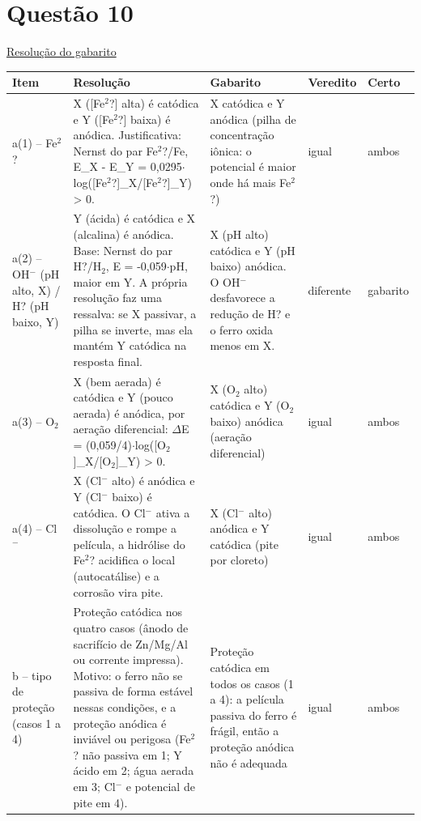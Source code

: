 \documentclass{article}%
\begin{document}
\section*{Questão 10}%
\href{https://poliedroresolve.sistemapoliedro.com.br/vestibulares/ita/2027/ita-2-fase-dia-2-21-10-2026-2-fase-dia-2/dissertativa-10-quimica-2-fase-dia-2-ita-2027}{Resolução do gabarito}\par\smallskip%
\begin{longtable}{@{}p{} p{} p{} p{} p{}@{}}\toprule Item & Resolução & Gabarito & Veredito & Certo \\ \midrule
a(1) -- Fe$^2$? & X ({[}Fe$^2$?{]} alta) é catódica e Y ({[}Fe$^2$?{]} baixa) é anódica. Justificativa: Nernst do par Fe$^2$?/Fe, E\_X - E\_Y = 0,0295$\cdot$log({[}Fe$^2$?{]}\_X/{[}Fe$^2$?{]}\_Y) > 0. & X catódica e Y anódica (pilha de concentração iônica: o potencial é maior onde há mais Fe$^2$?) & igual & ambos \\
a(2) -- OH$^{-}$ (pH alto, X) / H? (pH baixo, Y) & Y (ácida) é catódica e X (alcalina) é anódica. Base: Nernst do par H?/H$_{2}$, E = -0,059$\cdot$pH, maior em Y. A própria resolução faz uma ressalva: se X passivar, a pilha se inverte, mas ela mantém Y catódica na resposta final. & X (pH alto) catódica e Y (pH baixo) anódica. O OH$^{-}$ desfavorece a redução de H? e o ferro oxida menos em X. & diferente & gabarito \\
a(3) -- O$_{2}$ & X (bem aerada) é catódica e Y (pouco aerada) é anódica, por aeração diferencial: $\Delta$E = (0,059/4)$\cdot$log({[}O$_{2}${]}\_X/{[}O$_{2}${]}\_Y) > 0. & X (O$_{2}$ alto) catódica e Y (O$_{2}$ baixo) anódica (aeração diferencial) & igual & ambos \\
a(4) -- Cl$^{-}$ & X (Cl$^{-}$ alto) é anódica e Y (Cl$^{-}$ baixo) é catódica. O Cl$^{-}$ ativa a dissolução e rompe a película, a hidrólise do Fe$^2$? acidifica o local (autocatálise) e a corrosão vira pite. & X (Cl$^{-}$ alto) anódica e Y catódica (pite por cloreto) & igual & ambos \\
b -- tipo de proteção (casos 1 a 4) & Proteção catódica nos quatro casos (ânodo de sacrifício de Zn/Mg/Al ou corrente impressa). Motivo: o ferro não se passiva de forma estável nessas condições, e a proteção anódica é inviável ou perigosa (Fe$^2$? não passiva em 1; Y ácido em 2; água aerada em 3; Cl$^{-}$ e potencial de pite em 4). & Proteção catódica em todos os casos (1 a 4): a película passiva do ferro é frágil, então a proteção anódica não é adequada & igual & ambos \\
\bottomrule\end{longtable}%
\end{document}
